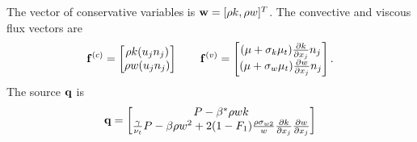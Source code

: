 \documentclass[oneside,a4paper,11pt]{report}
\begin{document}
The vector of conservative variables is $\mathbf{w} = [\rho k, \rho w]^T$. The convective and viscous flux vectors are 
\begin{equation}
    \mathbf{f}^{(c)} = \begin{bmatrix} \rho k (u_j n_j) \\ \rho w (u_j n_j) \end{bmatrix}
    \qquad
    \mathbf{f}^{(v)} = \begin{bmatrix} (\mu + \sigma_k \mu_t) \frac{\partial k}{\partial x_j} n_j \\ (\mu + \sigma_w \mu_t) \frac{\partial w}{\partial x_j} n_j \end{bmatrix}.
\end{equation}
The source $\mathbf{q}$ is
\begin{equation}
\label{eq:sst_source}
    \mathbf{q} = \begin{bmatrix} P - \beta^* \rho w k \\ \frac{\gamma}{\nu_t} P - \beta \rho w^2 + 2 (1-F_1) \frac{\rho \sigma_{w2}}{w} \frac{ \partial k}{\partial x_j} \frac{\partial w}{\partial x_j} \end{bmatrix}
\end{equation}
\end{document}
